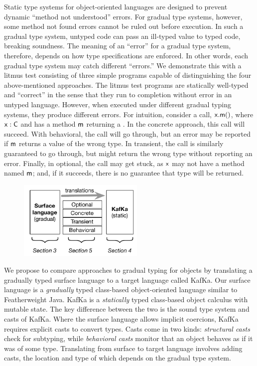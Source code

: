 \documentclass[a4paper,USenglish]{lipics-v2018}
\newcommand{\EM}[1]{\ensuremath{#1}\xspace}
\newcommand{\xt}[1]{{\sf{#1}}}
\newcommand{\EMxt}[1]{\EM{\xt{#1}}}
\newcommand{\x}{\EMxt x}
\newcommand{\m}{\EMxt m}
\newcommand{\kafka}{{\sf KafKa}\xspace}
\begin{document}
Static type systems for object-oriented languages are designed to prevent dynamic ``method not understood'' errors. For
gradual type systems, however, some method not found errors cannot be ruled out before
execution. In such a gradual type system, untyped code can pass an ill-typed value to typed code, breaking soundness. 
The meaning of an ``error'' for a gradual type system, therefore, depends on how type specifications are
enforced. In other words, each gradual type system may catch different
``errors.'' We demonstrate this with a litmus test consisting of three
simple programs capable of distinguishing the four above-mentioned
approaches. The litmus test programs are statically well-typed and
``correct'' in the sense that they run to completion without error in an
untyped language. However, when executed under different gradual typing
systems, they produce different errors. For intuition, consider a call,
\EM{\x.\m()}, where \EM{\x:\C} and \C has a method \m returning a \D. In
the concrete approach, this call will succeed. With behavioral, the call
will go through, but an error may be reported if \m returns a value of the
wrong type. In transient, the call is similarly guaranteed to go through,
but might return the wrong type without reporting an error. Finally, in
optional, the call may get stuck, as \x may not have a method named \m; and,
if it succeeds, there is no guarantee that type \D will be returned.

\begin{figure}
\vspace{-6mm}
\includegraphics[width=6cm]{fig1}
\vspace{-8mm}\end{figure}

We propose to compare approaches to gradual typing for objects by
translating a gradually typed surface language to a target language called
\kafka. Our surface language is a \emph{gradually} typed class-based object-oriented 
language similar to Featherweight Java. \kafka is a
\emph{statically} typed class-based object calculus with mutable state. The
key difference between the two is the sound type system and casts of \kafka.
Where the surface language allows implicit coercions, \kafka requires
explicit casts to convert types. Casts come in two kinds: \emph{structural
casts} check for subtyping, while \emph{behavioral casts} monitor that an
object behaves as if it was of some type. Translating from surface to target
language involves adding casts, the location and type of which depends on
the gradual type system.
\end{document}

